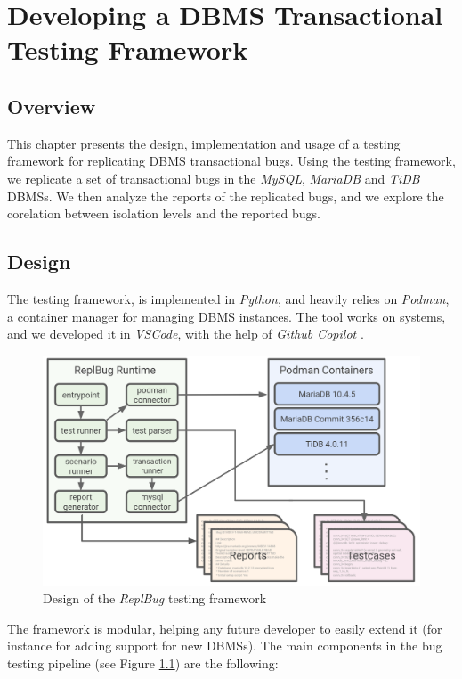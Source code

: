 \chapter{Developing a DBMS Transactional Testing Framework}

\section{Overview}

This chapter presents the design, implementation and usage of a testing framework for replicating DBMS transactional bugs. Using the testing framework, we replicate a set of transactional bugs in the \textit{MySQL}, \textit{MariaDB} and \textit{TiDB} DBMSs. We then analyze the reports of the replicated bugs, and we explore the corelation between isolation levels and the reported bugs.

\section{Design}

The testing framework, is implemented in \textit{Python}, and heavily relies on \textit{Podman}, a container manager \cite{podmanwebpage} for managing DBMS instances. The tool works on  systems, and we developed it in \textit{VSCode}, with the help of \textit{Github Copilot} \cite{copilotwebpage}.


\begin{figure}[!h]
    \centering
    \includegraphics[width=\linewidth]{assets/replbug_design.png}
    \caption{Design of the \textit{ReplBug} testing framework}
    \label{fig:replb_design}
\end{figure}


The framework is modular, helping any future developer to easily extend it (for instance for adding support for new DBMSs). The main components in the bug testing pipeline (see Figure \ref{fig:replb_design}) are the following:

